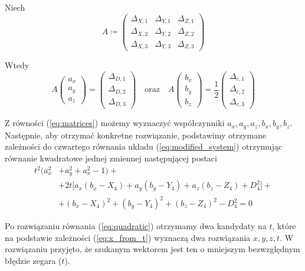 \documentclass{article}
\begin{document}
Niech
\[
A \coloneqq
\begin{pmatrix}
\Delta_{X,1} & \Delta_{Y,1} & \Delta_{Z, 1} \\
\Delta_{X,2} & \Delta_{Y,2} & \Delta_{Z, 2} \\
\Delta_{X,3} & \Delta_{Y,3} & \Delta_{Z, 3}
\end{pmatrix}
\]

Wtedy
\begin{equation}
    \label{eq:matrices}
    A
    \begin{pmatrix}
        a_x \\ a_y \\ a_z
    \end{pmatrix}
    =
    \begin{pmatrix}
        \Delta_{D, 1} \\ \Delta_{D, 2} \\ \Delta_{D, 3}
    \end{pmatrix}
    \quad \textrm{oraz} \quad
    A
    \begin{pmatrix}
        b_x \\ b_y \\ b_z
    \end{pmatrix}
    =
    \frac{1}{2}
    \begin{pmatrix}
        \Delta_{c, 1} \\
        \Delta_{c, 2} \\
        \Delta_{c, 3}
    \end{pmatrix}
\end{equation}

Z równości (\ref{eq:matrices}) możemy wyznaczyć współczynniki $a_x, a_y, a_z, b_x, b_y, b_z$.
Następnie, aby otrzymać konkretne rozwiązanie, podstawimy otrzymane zależności do czwartego równania układu
(\ref{eq:modified_system}) otrzymując równanie kwadratowe jednej zmiennej następującej postaci
\begin{equation} \label{eq:quadratic}
\begin{split}
  t^2(a_x^2&+a_y^2+a_x^2-1) + \\
  &+ 2t\big[ a_x(b_x-X_4)+a_y(b_y-Y_4)+a_z(b_z-Z_4)+D_4^2\big] + \\
  &+ (b_x-X_4)^2+(b_y-Y_4)^2+(b_z-Z_4)^2-D_4^2 = 0
\end{split}
\end{equation}

Po rozwiązaniu równania (\ref{eq:quadratic}) otrzymamy dwa kandydaty na $t$, które
na podstawie zależności (\ref{eq:x_from_t}) wyznaczą dwa rozwiązania $x, y, z, t$.
W rozwiązaniu przyjęto, że szukanym wektorem jest ten o mniejszym bezwzględnym błędzie zegara ($t$).
\end{document}
